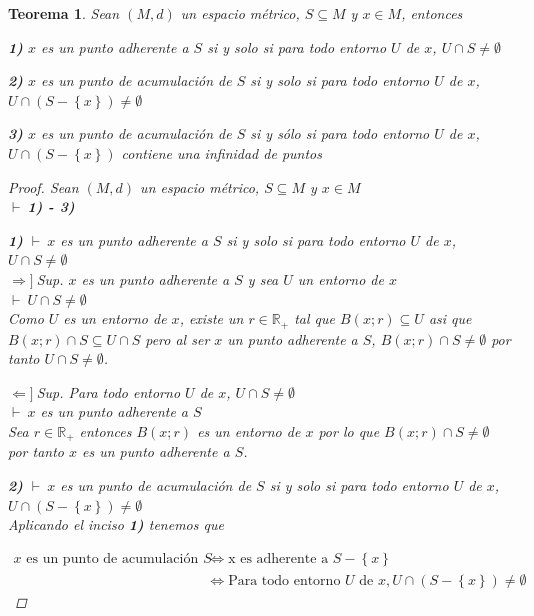 \documentclass[oneside]{book} %
\theoremstyle{Teorema}
\newtheorem{Teorema}[Definicion]{Teorema}
\theoremstyle{Ejemplos}
\theoremstyle{[Obs]}
\renewcommand{\{}{\left\lbrace} %
\renewcommand{\}}{\right\rbrace} %
\newcommand{\n}{\cap} %
\renewcommand{\sc}{\subseteq} %
\newcommand{\R}{\mathbb{R}} %
\newcommand{\pd}{$\vdash\ $} %
\newcommand{\necesidad}{$\Rightarrow]\ $} %
\newcommand{\suficiencia}{$\Leftarrow]\ $} %
\begin{document}
			\begin{Teorema}\setlength{\parindent}{0em}
						
				Sean $(M, d)$ un espacio métrico, $S \sc M$ y $x \in M$, entonces 
				
				\textbf{1)} $x$ es un punto adherente a $S$ si y solo si para todo entorno $U$ de $x$, $U \n S \neq \emptyset$ 

				\textbf{2)} $x$ es un punto de acumulación de $S$ si y solo si para todo entorno $U$ de $x$, $U \n (S - \{ x \}) \neq \emptyset$

				\textbf{3)} $x$ es un punto de acumulación de $S$ si y sólo si para todo entorno $U$ de $x$, $U \n (S - \{ x \})$ contiene una infinidad de puntos

				\begin{proof}
					
					Sean $(M, d)$ un espacio métrico, $S \sc M$ y $x \in M$ \\ 
					\pd \textbf{1) - 3)}

					\textbf{1)} \pd $x$ es un punto adherente a $S$ si y solo si para todo entorno $U$ de $x$, $U \n S \neq \emptyset$ \\ 
					\necesidad Sup. $x$ es un punto adherente a $S$ y sea $U$ un entorno de $x$ \\ 
					\pd $U \n S \neq \emptyset$ \\ 
					Como $U$ es un entorno de $x$, existe un $r \in \R_{+}$ tal que $B(x;r) \sc U$ asi que $B(x;r) \n S \sc U \n S$ pero al ser $x$ un punto adherente a $S$, $B(x;r) \n S \neq \emptyset$ por tanto $U \n S \neq \emptyset$.

					\suficiencia Sup. Para todo entorno $U$ de $x$, $U \n S \neq \emptyset$ \\ 
					\pd $x$ es un punto adherente a $S$ \\ 
					Sea $r \in \R_{+}$ entonces $B(x;r)$ es un entorno de $x$ por lo que $B(x;r) \n S \neq \emptyset$ por tanto $x$ es un punto adherente a $S$.

					\textbf{2)} \pd $x$ es un punto de acumulación de $S$ si y solo si para todo entorno $U$ de $x$, $U \n (S - \{ x \}) \neq \emptyset$ \\ 
					Aplicando el inciso \textbf{1)} tenemos que

					\begin{align*}
						x \text{ es un punto de acumulación de } S & \Leftrightarrow \text{x es adherente a } S - \{ x \} \\ 
						& \Leftrightarrow \text{Para todo entorno } U \text{ de } x, U \n (S - \{ x \}) \neq \emptyset
					\end{align*}


\end{proof}
\end{Teorema}
\end{document}
